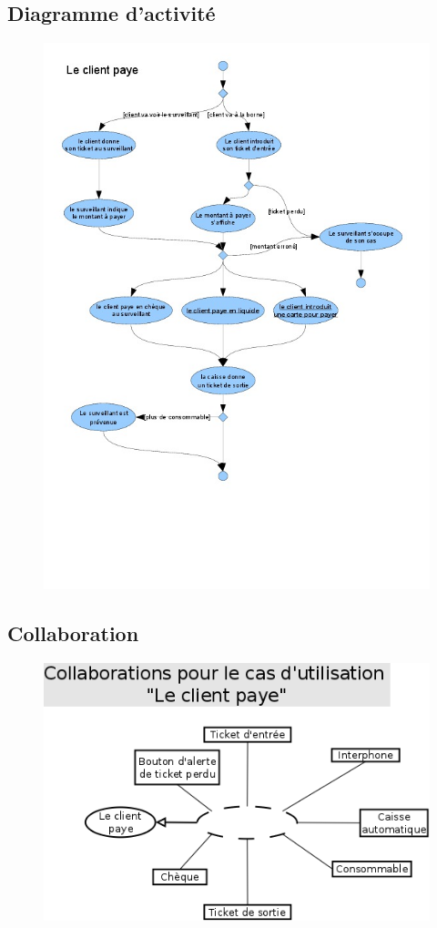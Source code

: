 \documentclass[a4paper]{article}
\begin{document}
\subsection{Diagramme d'activit\'e}
\begin{figure}[!ht]
\centering
\includegraphics[scale=.7]{imgs/act_paye.jpg}
\end{figure}

\subsection{Collaboration}
\begin{figure}[!ht]
\centering
\includegraphics[scale=.5]{collaborations/_paye.png}
\end{figure}
\end{document}
